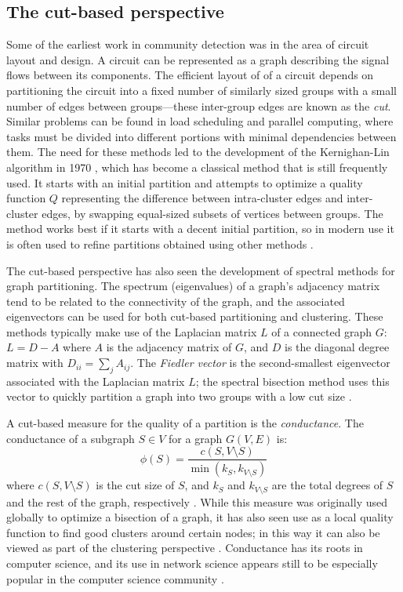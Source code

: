 \hypertarget{the-cut-based-perspective}{\subsection{The cut-based
perspective}\label{the-cut-based-perspective}}

Some of the earliest work in community detection was in the area of
circuit layout and design. A circuit can be represented as a graph
describing the signal flows between its components. The efficient layout
of of a circuit depends on partitioning the circuit into a fixed number
of similarly sized groups with a small number of edges between
groups---these inter-group edges are known as the \emph{cut}. Similar
problems can be found in load scheduling and parallel computing, where
tasks must be divided into different portions with minimal dependencies
between them. The need for these methods led to the development of the
Kernighan-Lin algorithm in 1970 \autocite{kernighan_efficient_1970},
which has become a classical method that is still frequently used. It
starts with an initial partition and attempts to optimize a quality
function \(Q\) representing the difference between intra-cluster edges
and inter-cluster edges, by swapping equal-sized subsets of vertices
between groups. The method works best if it starts with a decent initial
partition, so in modern use it is often used to refine partitions
obtained using other methods \autocite{fortunato_community_2010}.

The cut-based perspective has also seen the development of spectral
methods for graph partitioning. The spectrum (eigenvalues) of a graph's
adjacency matrix tend to be related to the connectivity of the graph,
and the associated eigenvectors can be used for both cut-based
partitioning and clustering. These methods typically make use of the
Laplacian matrix \(L\) of a connected graph \(G\): \(L = D - A\) where
\(A\) is the adjacency matrix of \(G\), and \(D\) is the diagonal degree
matrix with \(D_{ii} = \sum_{j}{A_{ij}}\). The \emph{Fiedler vector} is
the second-smallest eigenvector associated with the Laplacian matrix
\(L\); the spectral bisection method uses this vector to quickly
partition a graph into two groups with a low cut size
\autocite{fiedler_algebraic_1973}.

A cut-based measure for the quality of a partition is the
\emph{conductance}. The conductance of a subgraph \(S \in V\) for a
graph \(G(V, E)\) is:
\[\phi(S) = \frac{c(S, V \setminus S)}{\min(k_S, k_{V \setminus S})}\]
where \(c(S, V \setminus S)\) is the cut size of \(S\), and \(k_S\) and
\(k_{V \setminus S}\) are the total degrees of \(S\) and the rest of the
graph, respectively \autocite{schaeffer_graph_2007}. While this measure
was originally used globally to optimize a bisection of a graph, it has
also seen use as a local quality function to find good clusters around
certain nodes; in this way it can also be viewed as part of the
clustering perspective \autocite{schaub_many_2017}. Conductance has its
roots in computer science, and its use in network science appears still
to be especially popular in the computer science community
\autocites{schaeffer_graph_2007}{yang_defining_2015}.

